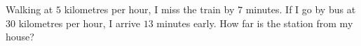 Walking at $5$ kilometres per hour, I miss the train by $7$ minutes. If I go by bus at $30$ kilometres per hour, I arrive $13$ minutes early. How far is the station from my house?
